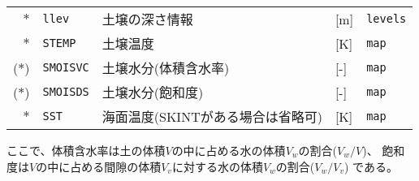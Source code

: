 {\begin{table}[hbt]
\begin{center}
\begin{tabularx}{150mm}{rl|l|l|X}
$\ast$ &\verb|llev|    & 土壌の深さ情報  & [m]      & \verb|levels| \\
$\ast$ &\verb|STEMP|   & 土壌温度        & [K]      & \verb|map| \\
($\ast$) &\verb|SMOISVC| & 土壌水分(体積含水率)     & [-] & \verb|map| \\
($\ast$) &\verb|SMOISDS| & 土壌水分(飽和度)         & [-] & \verb|map| \\
$\ast$ &\verb|SST|     & 海面温度(SKINTがある場合は省略可) & [K] & \verb|map|\\
\end{tabularx}
\label{tab:grdvar_item}
\end{center}
\end{table}
}

ここで、体積含水率は土の体積$V$の中に占める水の体積$V_w$の割合($V_w / V$)、
飽和度は$V$の中に占める間隙の体積$V_v$に対する水の体積$V_w$の割合($V_w / V_v$)
である。
